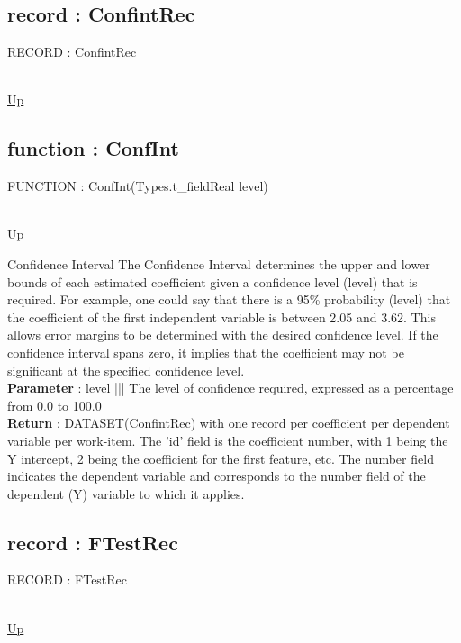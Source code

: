 \subsection*{record : ConfintRec}
\hypertarget{ecldoc:linearregression.ols.confintrec}{RECORD : ConfintRec} \\
\hyperlink{ecldoc:linearregression.ols}{Up} \\
\par
\subsection*{function : ConfInt}
\hypertarget{ecldoc:linearregression.ols.confint}{FUNCTION : ConfInt(Types.t\_fieldReal level)} \\
\hyperlink{ecldoc:linearregression.ols}{Up} \\
\par
Confidence Interval The Confidence Interval determines the upper and lower bounds of each estimated coefficient given a confidence level (level) that is required. For example, one could say that there is a 95\% probability (level) that the coefficient of the first independent variable is between 2.05 and 3.62. This allows error margins to be determined with the desired confidence level. If the confidence interval spans zero, it implies that the coefficient may not be significant at the specified confidence level. \\
\textbf{Parameter} : level ||| The level of confidence required, expressed as a percentage from 0.0 to 100.0 \\
\textbf{Return} : DATASET(ConfintRec) with one record per coefficient per dependent variable per work-item. The 'id' field is the coefficient number, with 1 being the Y intercept, 2 being the coefficient for the first feature, etc. The number field indicates the dependent variable and corresponds to the number field of the dependent (Y) variable to which it applies. \\
\subsection*{record : FTestRec}
\hypertarget{ecldoc:linearregression.ols.ftestrec}{RECORD : FTestRec} \\
\hyperlink{ecldoc:linearregression.ols}{Up} \\
\par
